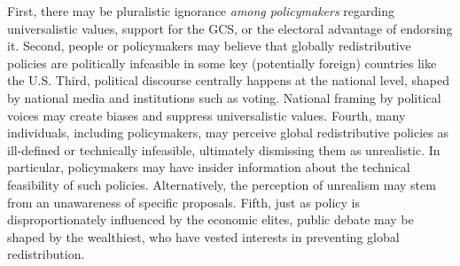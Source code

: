 \begin{bibunit}
First, there may be pluralistic ignorance \textit{among policymakers} regarding universalistic values, support for the GCS, or the electoral advantage of endorsing it. 
Second, people or policymakers may believe that globally redistributive policies are politically infeasible in some key (potentially foreign) countries like the U.S. %
Third, political discourse centrally happens at the national level, shaped by national media and institutions such as voting. 
National framing by political voices may create biases and suppress universalistic values. %
Fourth, many individuals, including policymakers, may perceive global redistributive policies as ill-defined or technically infeasible, ultimately dismissing them as unrealistic. In particular, policymakers may have insider information about the technical feasibility of such policies. Alternatively, the perception of unrealism may stem from an unawareness of specific proposals. %
Fifth, just as policy is disproportionately influenced by the economic elites,\citep{gilens_testing_2014,persson_rich_2023} public debate may be shaped by the wealthiest, who have vested interests in preventing global redistribution.


\end{bibunit}
